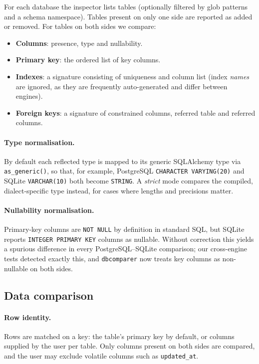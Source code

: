 \documentclass[11pt]{article}
\begin{document}
For each database the inspector lists tables (optionally filtered by glob
patterns and a schema namespace). Tables present on only one side are
reported as added or removed. For tables on both sides we compare:

\begin{itemize}
  \item \textbf{Columns}: presence, type and nullability.
  \item \textbf{Primary key}: the ordered list of key columns.
  \item \textbf{Indexes}: a signature consisting of uniqueness and column
        list (index \emph{names} are ignored, as they are frequently
        auto-generated and differ between engines).
  \item \textbf{Foreign keys}: a signature of constrained columns, referred
        table and referred columns.
\end{itemize}

\paragraph{Type normalisation.} By default each reflected type is mapped
to its generic SQLAlchemy type via \texttt{as\_generic()}, so that, for
example, PostgreSQL \texttt{CHARACTER VARYING(20)} and SQLite
\texttt{VARCHAR(10)} both become \texttt{STRING}. A \emph{strict} mode
compares the compiled, dialect-specific type instead, for cases where
lengths and precisions matter.

\paragraph{Nullability normalisation.} Primary-key columns are
\texttt{NOT NULL} by definition in standard SQL, but SQLite reports
\texttt{INTEGER PRIMARY KEY} columns as nullable. Without correction this
yields a spurious difference in every PostgreSQL--SQLite comparison; our
cross-engine tests detected exactly this, and \texttt{dbcomparer} now
treats key columns as non-nullable on both sides.

\subsection{Data comparison}

\paragraph{Row identity.} Rows are matched on a key: the table's primary
key by default, or columns supplied by the user per table. Only columns
present on both sides are compared, and the user may exclude volatile
columns such as \texttt{updated\_at}.
\end{document}
